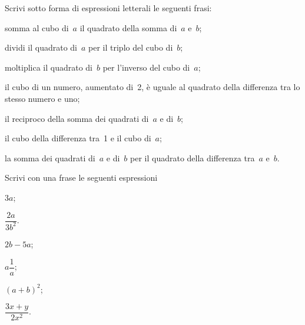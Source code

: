 \begin{esercizio}
\label{ese:9.10} %
Scrivi sotto forma di espressioni letterali le seguenti frasi:
 \begin{enumeratea}
 \item somma al cubo di~$a$ il quadrato della somma di~$a$ e~$b$;
 \item dividi il quadrato di~$a$ per il triplo del cubo di~$b$;
 \item moltiplica il quadrato di~$b$ per l'inverso del cubo di~$a$;
 \item il cubo di un numero, aumentato di~2, è uguale al quadrato della differenza tra lo stesso numero e uno;
 \item il reciproco della somma dei quadrati di~$a$ e di~$b$;
 \item il cubo della differenza tra~1 e il cubo di~$a$;
 \item la somma dei quadrati di~$a$ e di~$b$ per il quadrato della differenza tra~$a$ e~$b$.
 \end{enumeratea}
\end{esercizio}

\begin{esercizio}[\Ast]
\label{ese:9.11} %
Scrivi con una frase le seguenti espressioni
\begin{multicols}{3}
 \begin{enumeratea}
 \item $3a$;
 \item $\dfrac{2a}{3b^{2}}$.
 \item $2b-5a$;
 \item $a {\dfrac{1}{a}}$;
 \item $(a+b)^{2}$;
 \item $\dfrac{3x+y}{2x^{2}}$.
 \end{enumeratea}
\end{multicols}
\end{esercizio}


